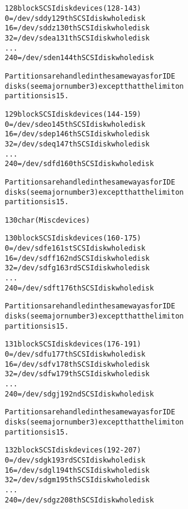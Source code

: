 \documentclass[a4paper,8pt,english]{sphinxmanual}
\begin{document}
\begin{alltt}
 128 block       SCSI disk devices (128-143)
                   0 = /dev/sddy         129th SCSI disk whole disk
                  16 = /dev/sddz         130th SCSI disk whole disk
                  32 = /dev/sdea         131th SCSI disk whole disk
                    ...
                 240 = /dev/sden         144th SCSI disk whole disk

                Partitions are handled in the same way as for IDE
                disks (see major number 3) except that the limit on
                partitions is 15.

 129 block       SCSI disk devices (144-159)
                   0 = /dev/sdeo         145th SCSI disk whole disk
                  16 = /dev/sdep         146th SCSI disk whole disk
                  32 = /dev/sdeq         147th SCSI disk whole disk
                    ...
                 240 = /dev/sdfd         160th SCSI disk whole disk

                Partitions are handled in the same way as for IDE
                disks (see major number 3) except that the limit on
                partitions is 15.

 130 char       (Misc devices)

 130 block       SCSI disk devices (160-175)
                   0 = /dev/sdfe         161st SCSI disk whole disk
                  16 = /dev/sdff         162nd SCSI disk whole disk
                  32 = /dev/sdfg         163rd SCSI disk whole disk
                    ...
                 240 = /dev/sdft         176th SCSI disk whole disk

                Partitions are handled in the same way as for IDE
                disks (see major number 3) except that the limit on
                partitions is 15.

 131 block       SCSI disk devices (176-191)
                   0 = /dev/sdfu         177th SCSI disk whole disk
                  16 = /dev/sdfv         178th SCSI disk whole disk
                  32 = /dev/sdfw         179th SCSI disk whole disk
                    ...
                 240 = /dev/sdgj         192nd SCSI disk whole disk

                Partitions are handled in the same way as for IDE
                disks (see major number 3) except that the limit on
                partitions is 15.

 132 block       SCSI disk devices (192-207)
                   0 = /dev/sdgk         193rd SCSI disk whole disk
                  16 = /dev/sdgl         194th SCSI disk whole disk
                  32 = /dev/sdgm         195th SCSI disk whole disk
                    ...
                 240 = /dev/sdgz         208th SCSI disk whole disk


\end{alltt}
\end{document}
